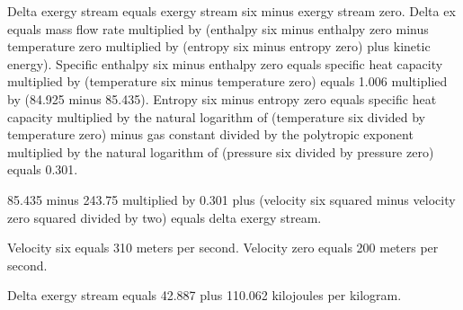 Delta exergy stream equals exergy stream six minus exergy stream zero.  
Delta ex equals mass flow rate multiplied by (enthalpy six minus enthalpy zero minus temperature zero multiplied by (entropy six minus entropy zero) plus kinetic energy).  
Specific enthalpy six minus enthalpy zero equals specific heat capacity multiplied by (temperature six minus temperature zero) equals 1.006 multiplied by (84.925 minus 85.435).  
Entropy six minus entropy zero equals specific heat capacity multiplied by the natural logarithm of (temperature six divided by temperature zero) minus gas constant divided by the polytropic exponent multiplied by the natural logarithm of (pressure six divided by pressure zero) equals 0.301.  

85.435 minus 243.75 multiplied by 0.301 plus (velocity six squared minus velocity zero squared divided by two) equals delta exergy stream.  

Velocity six equals 310 meters per second.  
Velocity zero equals 200 meters per second.  

Delta exergy stream equals 42.887 plus 110.062 kilojoules per kilogram.